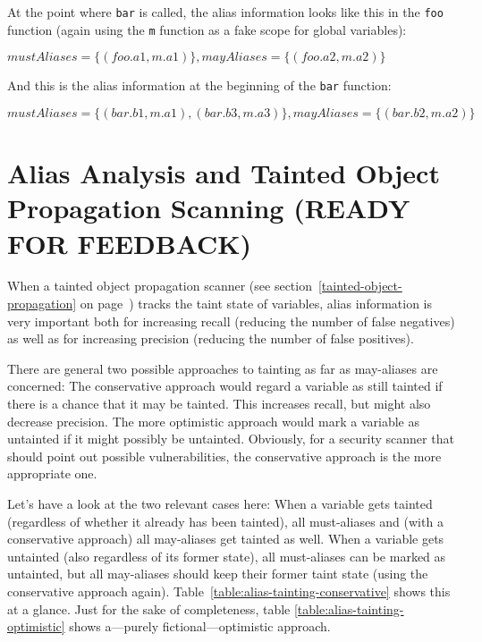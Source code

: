 At the point where \texttt{bar} is called, the alias information looks like this in the \texttt{foo} function (again using the \texttt{m} function as a fake scope for global variables):

$mustAliases = \{(foo.a1, m.a1)\}, mayAliases = \{(foo.a2, m.a2)\}$

And this is the alias information at the beginning of the \texttt{bar} function:

$mustAliases = \{(bar.b1, m.a1), (bar.b3, m.a3)\}, mayAliases = \{(bar.b2, m.a2)\}$




\section{Alias Analysis and Tainted Object Propagation Scanning (READY FOR FEEDBACK)}

When a tainted object propagation scanner (see section~\ref{tainted-object-propagation} on page~\pageref{tainted-object-propagation}) tracks the taint state of variables, alias information is very important both for increasing recall (\ie reducing the number of false negatives) as well as for increasing precision (\ie reducing the number of false positives).

There are general two possible approaches to tainting as far as may-aliases are concerned: The conservative approach would regard a variable as still tainted if there is a chance that it may be tainted. This increases recall, but might also decrease precision. The more optimistic approach would mark a variable as untainted if it might possibly be untainted. Obviously, for a security scanner that should point out possible vulnerabilities, the conservative approach is the more appropriate one.

Let's have a look at the two relevant cases here: When a variable gets tainted (regardless of whether it already has been tainted), all must-aliases and (with a conservative approach) all may-aliases get tainted as well. When a variable gets untainted (also regardless of its former state), all must-aliases can be marked as untainted, but all may-aliases should keep their former taint state (using the conservative approach again). Table~\ref{table:alias-tainting-conservative} shows this at a glance. Just for the sake of completeness, table \ref{table:alias-tainting-optimistic} shows a---purely fictional---optimistic approach.

